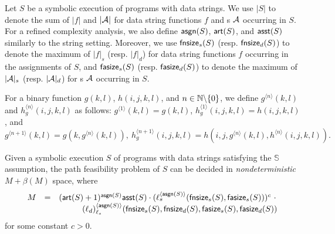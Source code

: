 Let $S$ be a symbolic execution of programs with data strings.  We use $|S|$ to denote the sum of $|f|$ and $|\mathcal{A}|$ for data string functions $f$ and \SA{}s $\mathcal{A}$ occurring in $S$.  
For a refined complexity analysis, we also define $\mathsf{asgn}(S)$, $\mathsf{art}(S)$, and $\mathsf{asst}(S)$ similarly to the string setting. Moreover, we use $\mathsf{fnsize}_s(S)$ (resp. $\mathsf{fnsize}_d(S)$) to denote the maximum of $|f|_s$ (resp. $|f|_d$) for data string functions $f$ occurring in the assignments of $S$, and $\mathsf{fasize}_s(S)$ (resp. $\mathsf{fasize}_d(S)$) to denote the maximum of $|\mathcal{A}|_s$ (resp. $|\mathcal{A}|_d$) for \SA{}s $\mathcal{A}$ occurring in $S$.





For a binary function $g(k, l)$, $h(i, j, k, l)$, and $n \in \mathbb{N} \backslash \{0\}$, we define $g^{\langle n \rangle}(k, l)$ and $h^{\langle n \rangle}_g(i, j, k, l)$ as follows: $g^{\langle 1 \rangle}( k, l) = g(k, l)$, $h^{\langle 1 \rangle}_g(i, j, k, l) = h(i, j, k, l)$, and 
$$g^{\langle n+1 \rangle}( k, l) = g(k, g^{\langle n \rangle}( k, l)), \ h^{\langle n+1 \rangle}_g (i, j, k, l) = h(i, j, g^{\langle n \rangle}(k, l), h^{\langle n \rangle}(i, j, k, l)).$$


\begin{theorem}\label{thm-generic-dec-symbolic}
	Given a symbolic execution  $S$ of programs with data strings satisfying the $\mathbb{S}$\prerec{} assumption, the path feasibility problem of $S$ can be decided in \emph{nondeterministic} $M+ \beta(M)$ space, where  
	\[
	\begin{array}{l c l}
		M & = & (\mathsf{art}(S)+1)^{\mathsf{asgn}(S)}  \mathsf{asst}(S) \cdot  (\ell_s^{\langle \mathsf{asgn}(S) \rangle}(\mathsf{fnsize}_s(S), \mathsf{fasize}_s(S)))^{c}\ \cdot \\
		& &  \hspace{1cm} (\ell_d)^{\langle  \mathsf{asgn}(S) \rangle}_{\ell_s}(\mathsf{fnsize}_s(S),\mathsf{fnsize}_d(S),  \mathsf{fasize}_s(S), \mathsf{fasize}_d(S))
\end{array}
	\]
for some constant $c > 0$. 
\end{theorem}




